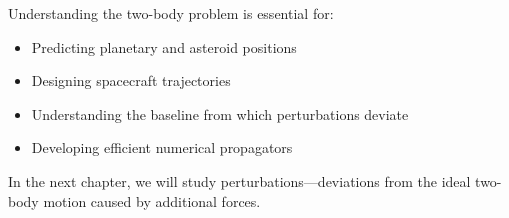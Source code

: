 Understanding the two-body problem is essential for:
\begin{itemize}
    \item Predicting planetary and asteroid positions
    \item Designing spacecraft trajectories
    \item Understanding the baseline from which perturbations deviate
    \item Developing efficient numerical propagators
\end{itemize}

In the next chapter, we will study perturbations—deviations from the ideal two-body motion caused by additional forces.
